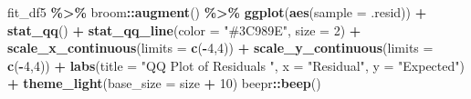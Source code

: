 \documentclass[
  english,
  man,floatsintext]{apa6}
\newenvironment{Shaded}{\begin{snugshade}}{\end{snugshade}}
\newcommand{\DataTypeTok}[1]{\textcolor[rgb]{0.13,0.29,0.53}{#1}}
\newcommand{\DecValTok}[1]{\textcolor[rgb]{0.00,0.00,0.81}{#1}}
\newcommand{\KeywordTok}[1]{\textcolor[rgb]{0.13,0.29,0.53}{\textbf{#1}}}
\newcommand{\NormalTok}[1]{#1}
\newcommand{\OperatorTok}[1]{\textcolor[rgb]{0.81,0.36,0.00}{\textbf{#1}}}
\newcommand{\StringTok}[1]{\textcolor[rgb]{0.31,0.60,0.02}{#1}}
\begin{document}
\begin{Shaded}
\begin{Highlighting}[]
\NormalTok{fit\_df5 }\OperatorTok{\%\textgreater{}\%}\StringTok{ }
\StringTok{  }\NormalTok{broom}\OperatorTok{::}\KeywordTok{augment}\NormalTok{() }\OperatorTok{\%\textgreater{}\%}\StringTok{ }
\StringTok{  }\KeywordTok{ggplot}\NormalTok{(}\KeywordTok{aes}\NormalTok{(}\DataTypeTok{sample =}\NormalTok{ .resid)) }\OperatorTok{+}\StringTok{ }
\StringTok{  }\KeywordTok{stat\_qq}\NormalTok{() }\OperatorTok{+}
\StringTok{  }\KeywordTok{stat\_qq\_line}\NormalTok{(}\DataTypeTok{color =} \StringTok{"\#3C989E"}\NormalTok{, }\DataTypeTok{size =} \DecValTok{2}\NormalTok{) }\OperatorTok{+}\StringTok{ }
\KeywordTok{scale\_x\_continuous}\NormalTok{(}\DataTypeTok{limits =} \KeywordTok{c}\NormalTok{(}\OperatorTok{{-}}\DecValTok{4}\NormalTok{,}\DecValTok{4}\NormalTok{)) }\OperatorTok{+}\StringTok{ }
\KeywordTok{scale\_y\_continuous}\NormalTok{(}\DataTypeTok{limits =} \KeywordTok{c}\NormalTok{(}\OperatorTok{{-}}\DecValTok{4}\NormalTok{,}\DecValTok{4}\NormalTok{)) }\OperatorTok{+}\StringTok{ }
\StringTok{  }\KeywordTok{labs}\NormalTok{(}\DataTypeTok{title =} \StringTok{"QQ Plot of Residuals "}\NormalTok{, }\DataTypeTok{x =} \StringTok{"Residual"}\NormalTok{, }\DataTypeTok{y =} \StringTok{"Expected"}\NormalTok{) }\OperatorTok{+}\StringTok{ }
\StringTok{  }\KeywordTok{theme\_light}\NormalTok{(}\DataTypeTok{base\_size =}\NormalTok{ size }\OperatorTok{+}\StringTok{ }\DecValTok{10}\NormalTok{)}
\NormalTok{beepr}\OperatorTok{::}\KeywordTok{beep}\NormalTok{()}
\end{Highlighting}
\end{Shaded}
\end{document}
